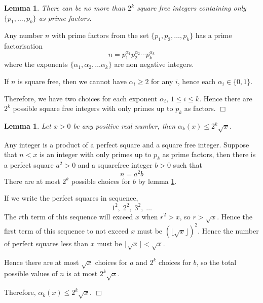 \documentclass[10pt]{article}
\newtheorem{lemma}[theorem]{Lemma}
\newenvironment{proof}[1][Proof]{\begin{trivlist}
\item[\hskip \labelsep {\bfseries #1}]}{\end{trivlist}}
\begin{document}
\begin{lemma}
\label{squarefree}
    There can be no more than $2^k$ square free integers
    containing only $\{p_1,\ldots,p_k\}$
    as prime factors.
\end{lemma}
\begin{proof}
    Any number $n$ with prime factors from the set $\{p_1,p_2,\ldots,p_k\}$
    has a prime factorisation
    \begin{equation*}
        n = p_1^{\alpha_1}p_2^{\alpha_2}\cdots p_k^{\alpha_k}
    \end{equation*}
    where the exponents $\{\alpha_1,\alpha_2,\ldots\alpha_k\}$
    are non negative integers.
    
    If $n$ is square free, then we cannot have $\alpha_i \geq 2$
    for any $i$, hence each $\alpha_i \in \{0,1\}$.
    
    Therefore, we have two choices for each exponent $\alpha_i$,
    $1\leq i\leq k$. Hence there are $2^k$ possible 
    square free integers with only primes up to
    $p_k$ as factors. $\Box$    
\end{proof}
\begin{lemma}
\label{alphaBound}
    Let $x>0$ be any positive real number, then $\alpha_k(x) \leq 2^k\sqrt{x}$.
\end{lemma}
\begin{proof}
    Any integer is a product of a perfect square and a square free
    integer. Suppose that $n < x$ is an integer
    with only primes up to $p_k$ as prime factors, then
    there is a perfect square $a^2>0$ and a squarefree integer $b > 0$ 
    such that
    \begin{equation*}
        n = a^2b
    \end{equation*}
    There are at most $2^k$ possible choices
    for $b$ by lemma \ref{squarefree}.
    
    If we write the perfect squares in sequence, 
    \begin{equation*}
        1^2,\;2^2,\;3^2,\;\ldots
    \end{equation*}
    The $r$th term of this sequence will exceed $x$ when $r^2 > x$,
    so $r > \sqrt{x}$. Hence the first term of this sequence
    to not exceed $x$ must be $(\lfloor\sqrt{x}\rfloor)^2$. Hence
    the number of perfect squares less than $x$ must be $\lfloor \sqrt{x}\rfloor < \sqrt{x}$.
    
    Hence there are at most $\sqrt{x}$ choices for $a$ and $2^k$ choices
    for $b$, so the total possible values of $n$ is at most $2^k\sqrt{x}$.
    
    Therefore, $\alpha_k(x) \leq 2^k\sqrt{x}$. $\Box$
\end{proof}
\end{document}
